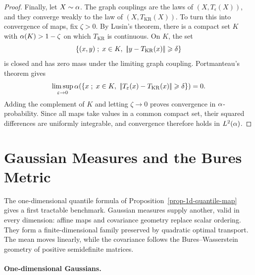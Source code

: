 \begin{proof}
	Finally, let $X\sim\alpha$. The graph couplings are the laws of $(X,T_\epsilon(X))$, and they converge weakly to the law of $(X,T_{\mathrm{KR}}(X))$. To turn this into convergence of maps, fix $\zeta>0$. By Lusin's theorem, there is a compact set $K$ with $\alpha(K)>1-\zeta$ on which $T_{\mathrm{KR}}$ is continuous. On $K$, the set
	\[
		\enscond{(x,y)}{x\in K,\ \norm{y-T_{\mathrm{KR}}(x)}\geq\delta}
	\]
	is closed and has zero mass under the limiting graph coupling. Portmanteau's theorem gives
	\[
		\limsup_{\epsilon\to0}
		\al\!\left(\enscond{x}{x\in K,\ \norm{T_\epsilon(x)-T_{\mathrm{KR}}(x)}\geq\delta}\right)
		=0.
	\]
	Adding the complement of $K$ and letting $\zeta\to0$ proves convergence in $\alpha$-probability. Since all maps take values in a common compact set, their squared differences are uniformly integrable, and convergence therefore holds in $L^2(\alpha)$.
\end{proof}

\section{Gaussian Measures and the Bures Metric}
\label{sec-gaussian-bures}

The one-dimensional quantile formula of Proposition~\ref{prop-1d-quantile-map} gives a first tractable benchmark. Gaussian measures supply another, valid in every dimension: affine maps and covariance geometry replace scalar ordering. They form a finite-dimensional family preserved by quadratic optimal transport. The mean moves linearly, while the covariance follows the Bures--Wasserstein geometry of positive semidefinite matrices.

\paragraph{One-dimensional Gaussians.}

